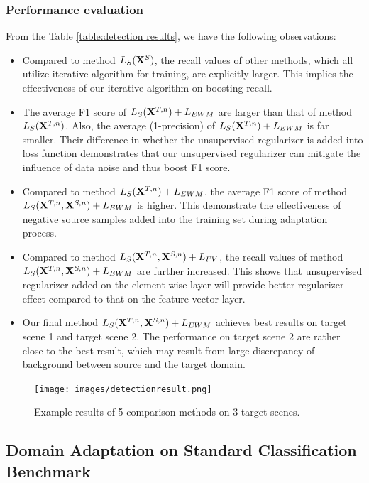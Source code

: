 \documentclass[runningheads]{llncs}
\begin{document}
\subsubsection{Performance evaluation}
From the Table \ref{table:detection results}, we have the following observations:
\begin{itemize}
    \item Compared to method $L_{S}({\bf X}^{S})$, the recall values of other methods, which all utilize iterative algorithm for training, are explicitly larger. This implies the effectiveness of our iterative algorithm on boosting recall.
    \item The average F1 score of $L_{S}({\bf X}^{T,n})+L_{EWM}$ are larger than that of method $L_{S}({\bf X}^{T,n})$. Also, the average (1-precision) of $L_{S}({\bf X}^{T,n})+L_{EWM}$ is far smaller. Their difference in whether the unsupervised regularizer is added into loss function demonstrates that our unsupervised regularizer can mitigate the influence of data noise and thus boost F1 score.
    \item Compared to method $L_{S}({\bf X}^{T,n})+L_{EWM}$, the average F1 score of method $L_{S}({\bf X}^{T,n},{\bf X}^{S,n})+L_{EWM}$ is higher. This demonstrate the effectiveness of negative source samples added into the training set during adaptation process.
    \item Compared to method $L_{S}({\bf X}^{T,n},{\bf X}^{S,n})+L_{FV}$, the recall values of method $L_{S}({\bf X}^{T,n},{\bf X}^{S,n})+L_{EWM}$ are further increased. This shows that unsupervised regularizer added on the element-wise layer will provide better regularizer effect compared to that on the feature vector layer.
    \item Our final method $L_{S}({\bf X}^{T,n},{\bf X}^{S,n})+L_{EWM}$ achieves best results on target scene 1 and target scene 2. The performance on target scene 2 are rather close to the best result, which may result from large discrepancy of background between source and the target domain.
\end{itemize}

\begin{figure}
\centering
\texttt{[image: images/detectionresult.png]}
\caption{Example results of 5 comparison methods on 3 target scenes.}
\label{fig:detectionresult}
\end{figure}


\subsection{Domain Adaptation on Standard Classification Benchmark}
\end{document}
